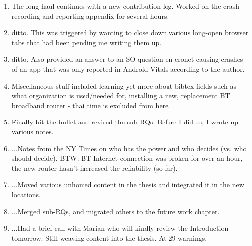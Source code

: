 \begin{enumerate}
    \item The long haul continues with a new contribution log. Worked on the crash recording and reporting appendix for several hours.
    \item ditto. This was triggered by wanting to close down various long-open browser tabs that had been pending me writing them up.
    \item ditto. Also provided an answer to an SO question on cronet causing crashes of an app that was only reported in Android Vitals according to the author.
    \item Miscellaneous stuff included learning yet more about bibtex fields such as what organization is used/needed for, installing a new, replacement BT broadband router - that time is excluded from here.
    \item Finally bit the bullet and revised the sub-RQs. Before I did so, I wrote up various notes.
    \item ...Notes from the NY Times on who has the power and who decides (vs. who should decide). BTW: BT Internet connection was broken for over an hour, the new router hasn't increased the reliability (so far).
    \item ...Moved various unhomed content in the thesis and integrated it in the new locations.
    \item ...Merged sub-RQs, and migrated others to the future work chapter.
    \item ...Had a brief call with Marian who will kindly review the Introduction tomorrow. Still weaving content into the thesis. At 29 warnings.

\end{enumerate}